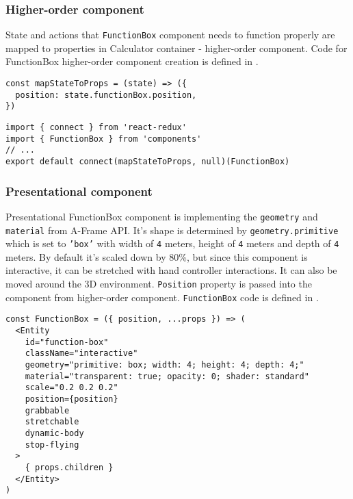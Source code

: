 \subsubsection{Higher-order component}
State and actions that \texttt{FunctionBox} component needs to function properly are mapped to properties in Calculator container -  higher-order component. Code for FunctionBox higher-order component creation is defined in .

\begin{lstlisting}[caption={Function to map \texttt{functionBox} state to component properties.},captionpos=b]
const mapStateToProps = (state) => ({
  position: state.functionBox.position,
})
\end{lstlisting}

\begin{lstlisting}[caption={Creation of \texttt{FunctionBox} higher-order component.},captionpos=b]
import { connect } from 'react-redux'
import { FunctionBox } from 'components'
// ...
export default connect(mapStateToProps, null)(FunctionBox)
\end{lstlisting}

\subsubsection{Presentational component}
Presentational FunctionBox component is implementing the \texttt{geometry} and \texttt{material} from A-Frame API. It's shape is determined by \texttt{geometry.primitive} which is set to \texttt{'box'} with width of \texttt{4} meters, height of \texttt{4} meters and depth of \texttt{4} meters. By default it's scaled down by 80\%, but since this component is interactive, it can be stretched with hand controller interactions. It can also be moved around the 3D environment. \texttt{Position} property is passed into the component from higher-order component. \texttt{FunctionBox} code is defined in .

\begin{lstlisting}[caption={Presentational \textsl{FunctionBox} component code.},captionpos=b]
const FunctionBox = ({ position, ...props }) => (
  <Entity
    id="function-box"
    className="interactive"
    geometry="primitive: box; width: 4; height: 4; depth: 4;"
    material="transparent: true; opacity: 0; shader: standard"
    scale="0.2 0.2 0.2"
    position={position}
    grabbable
    stretchable
    dynamic-body
    stop-flying
  >
    { props.children }
  </Entity>
)  
\end{lstlisting}

